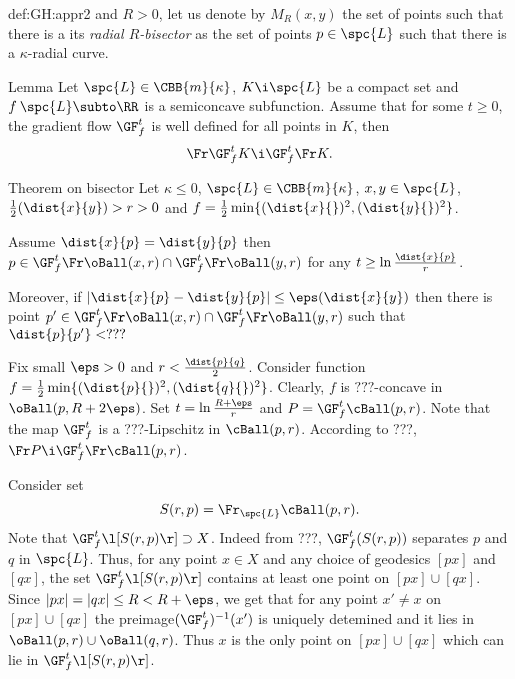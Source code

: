 {\begin{subthm}{def:GH:appr2}
and $R>0$, let us denote by $M_R(x,y)$ the set of points
such that there is a   its \emph{radial $R$-bisector} as the set of points $p\in \spc{L}$ such that there is a $\kappa$-radial curve.

\begin{thm}{Lemma}
Let $\spc{L}\in \CBB{m}{\kappa}$,
$K\i \spc{L}$ be a compact set
and $f\:\spc{L}\subto\RR$ is a semiconcave subfunction.
Assume that for some $t\ge0$, the  gradient flow $\GF_f^t$ is well defined for all points in $K$, then 
$$\Fr\GF^t_fK\i\GF_f^t\Fr K.$$

\end{thm}




\begin{thm}{Theorem on bisector}
Let $\kappa\le 0$,
$\spc{L}\in \CBB{m}{\kappa}$, 
$x,y\in \spc{L}$,
$\tfrac12(\dist{x}{y})>r>0$ 
and $f=\tfrac12\min\{(\dist{x}{})^2,(\dist{y}{})^2\}$.

Assume $\dist{x}{p}=\dist{y}{p}$ then $p\in\GF_f^t\Fr\oBall(x,r)\cap\GF_f^t\Fr\oBall(y,r)$ 
for any $t\ge \ln\tfrac{\dist{x}{p}}r$.

Moreover, if $|\dist{x}{p}-\dist{y}{p}|\le\eps(\dist{x}{y})$ then there is point $p'\in\GF_f^t\Fr\oBall(x,r)\cap\GF_f^t\Fr\oBall(y,r)$ such that $\dist{p}{p'}<???$
\end{thm}













Fix small $\eps>0$ and $r<\tfrac{\dist{p}{q}}2$.
Consider function $f=\tfrac12\min\{(\dist{p}{})^2,(\dist{q}{})^2\}$.
Clearly, $f$ is $???$-concave in $\oBall(p,R+2\eps)$.
Set $t=\ln\tfrac{R+\eps}r$ and $P=\GF_f^t\cBall(p,r)$.
Note that the map $\GF_f^t$ is a ???-Lipschitz in $\cBall(p,r)$.
According to ???, $\Fr P\i  \GF_f^t\Fr\cBall(p,r)$.

Consider set
$$S(r,p)=\Fr_\spc{L}\cBall(p,r).$$
Note that $\GF_f^t \l[S(r,p)\r]\supset X$.
Indeed from ???,
$\GF^{t}_f(S(r,p))$ separates $p$ and $q$ in $\spc{L}$.
Thus, for any point $x\in X$ and any choice of geodesics $[px]$ and $[qx]$, 
the set $\GF_f^t \l[S(r,p)\r]$ contains at least one point on $[px]\cup[qx]$.
Since $|px|=|qx|\le R<R+\eps$, we get that for any point $x'\not=x$ on $[px]\cup[qx]$ the preimage$(\GF^{t}_f)^{-1}(x')$ is uniquely detemined and it lies in $\oBall(p,r)\cup\oBall(q,r)$.
Thus $x$ is the only point on $[px]\cup[qx]$ which can lie in $\GF_f^t \l[S(r,p)\r]$.


\end{subthm}}
